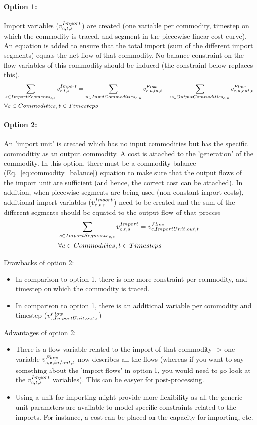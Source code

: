 \documentclass[10pt,english]{article}
\begin{document}
\paragraph{Option 1:}
Import variables ($\vImport$) are created (one variable per commodity, timestep on which the commodity is traced, and segment in the piecewise linear cost curve). An equation is added to ensure that the total import (sum of the different import segments) equals the net flow of that commodity. No balance constraint on the flow variables of this commodity should be induced (the constraint below replaces this). 
\begin{align}
&\sum_{\segment \in \ImportSegments} \vImport =  \sum_{\unit \in \InputCommodities} \vFlow[\commodity,\unit,in,\timestep]  - \sum_{\unit \in \OutputCommodities} \vFlow[\commodity,\unit,out,\timestep]  \nonumber \\
& \forall \commodities, \timesteps
\end{align}
\paragraph{Option 2:}
An 'import unit' is created which has no input commodities but has the specific commoditiy as an output commodity. A cost is attached to the 'generation' of the commodity. In this option, there must be a commodity balance (Eq.~\eqref{eq:commodity_balance}) equation to make sure that the output flows of the import unit are sufficient (and hence, the correct cost can be attached). In addition, when piecewise segments are being used (non-constant import costs), additional import variables ($\vImport$) need to be created and the sum of the different segments should be equated to the output flow of that process
\begin{align}
&\sum_{\segment \in \ImportSegments} \vImport =  \vFlow[\commodity,ImportUnit,out,\timestep] \nonumber \\
& \forall \commodities, \timesteps
\end{align}

Drawbacks of option 2:
\begin{itemize} 
	\item In comparison to option 1, there is one more constraint per commodity, and timestep on which the commodity is traced.
	\item In comparison to option 1, there is an additional variable per commodity and timestep ($\vFlow[\commodity,ImportUnit,out,\timestep]$)
\end{itemize}
Advantages of option 2:
\begin{itemize}
	\item There is a flow variable related to the import of that commodity -> one variable $\vFlow$ now describes all the flows (whereas if you want to say something about the 'import flows' in option 1, you would need to go look at the $\vImport$ variables). This can be easyer for post-processing.
	\item Using a unit for importing might provide more flexibility as all the generic unit parameters are available to model specific constraints related to the imports. For instance, a cost can be placed on the capacity for importing, etc. 
\end{itemize}
\end{document}
